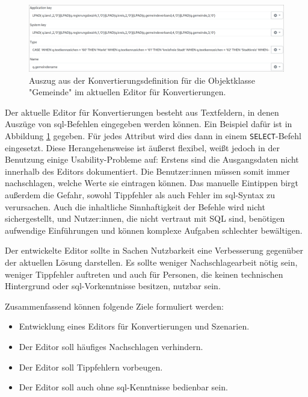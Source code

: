 \begin{figure}[h]
  \includegraphics[width=\textwidth]{assets/conversion-gemeinde.png}
  \caption{Auszug aus der Konvertierungsdefinition für die Objektklasse "Gemeinde" im aktuellen Editor für Konvertierungen.}
  \label{fig:conversion-gemeinde}
\end{figure}

Der aktuelle Editor für Konvertierungen besteht aus Textfeldern, in denen Auszüge von \ac{sql}-Befehlen eingegeben werden können. Ein Beispiel dafür ist in Abbildung \ref{fig:conversion-gemeinde} gegeben. Für jedes Attribut wird dies dann in einem \texttt{SELECT}-Befehl eingesetzt. Diese Herangehensweise ist äußerst flexibel, weißt jedoch in der Benutzung einige Usability-Probleme auf: Erstens sind die Ausgangsdaten nicht innerhalb des Editors dokumentiert. Die Benutzer:innen müssen somit immer nachschlagen, welche Werte sie eintragen können. Das manuelle Eintippen birgt außerdem die Gefahr, sowohl Tippfehler als auch Fehler im \ac{sql}-Syntax zu verursachen. Auch die inhaltliche Sinnhaftigkeit der Befehle wird nicht sichergestellt, und Nutzer:innen, die nicht vertraut mit SQL sind, benötigen aufwendige Einführungen und können komplexe Aufgaben schlechter bewältigen. 

Der entwickelte Editor sollte in Sachen Nutzbarkeit eine Verbesserung gegenüber der aktuellen Lösung darstellen. Es sollte weniger Nachschlagearbeit nötig sein, weniger Tippfehler auftreten und auch für Personen, die keinen technischen Hintergrund oder \ac{sql}-Vorkenntnisse besitzen, nutzbar sein.

Zusammenfassend können folgende Ziele formuliert werden:
\begin{itemize}
  \item Entwicklung eines Editors für Konvertierungen und Szenarien.
  \item Der Editor soll häufiges Nachschlagen verhindern.
  \item Der Editor soll Tippfehlern vorbeugen.
  \item Der Editor soll auch ohne \ac{sql}-Kenntnisse bedienbar sein.
\end{itemize}
